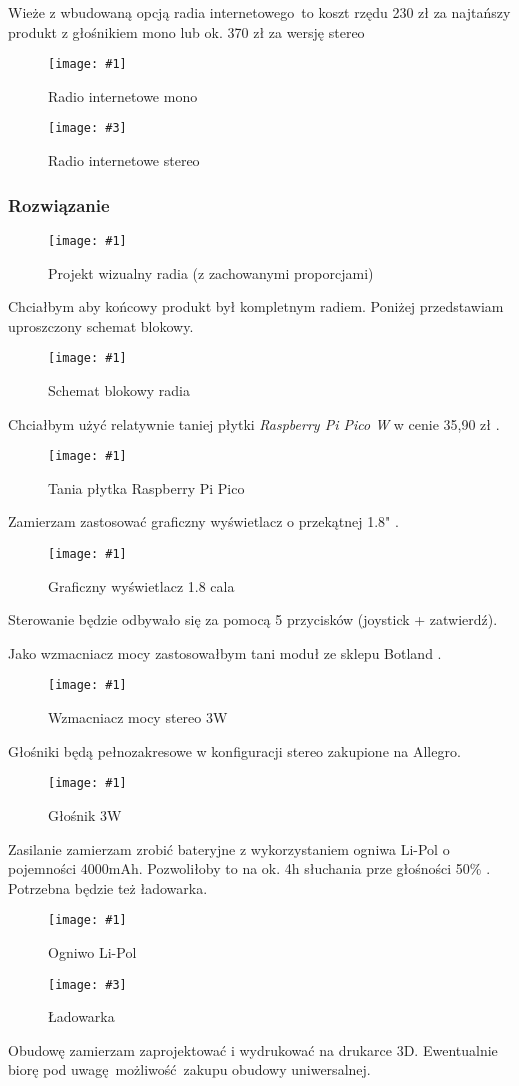\documentclass[12pt]{article}
\newcommand{\imgcustomsize}[3]{
	\begin{figure}[H]
		\centering
		\texttt{[image: \#1]}
		\caption{#2}
	\end{figure}
}
\newcommand{\img}[2]{\imgcustomsize{#1}{#2}{0.7}}
\newcommand{\imgsidebyside}[4]{
	\begin{figure}[H]
		\centering
		\begin{minipage}{.45\textwidth}
			\centering
			\texttt{[image: \#1]}
			\caption{#2}
		\end{minipage}%
		\hfill
		\begin{minipage}{.45\textwidth}
			\centering
			\texttt{[image: \#3]}
			\caption{#4}
		\end{minipage}
	\end{figure}
}
\begin{document}
		Wieże z wbudowaną opcją radia internetowego to koszt rzędu 230 zł za najtańszy produkt z głośnikiem mono \textsuperscript{\cite{xkom_tanie}} lub ok. 370 zł za wersję stereo \textsuperscript{\cite{xkom_drogie}}
		\imgsidebyside{xkom_tanie}{Radio internetowe mono}{xkom_drogie}{Radio internetowe stereo}
		
		\subsubsection{Rozwiązanie}
		\imgcustomsize{radio_proj_trimmed}{Projekt wizualny radia (z zachowanymi proporcjami)}{0.9}
		
		
		Chciałbym aby końcowy produkt był kompletnym radiem. Poniżej przedstawiam uproszczony schemat blokowy.
		\imgcustomsize{PicoRadio_blocks}{Schemat blokowy radia}{1}
		
		\pagebreak
		Chciałbym użyć relatywnie taniej płytki \textit{Raspberry Pi Pico W} w cenie 35,90 zł \textsuperscript{\cite{botland_pi_pico}}.
		\img{botland_pi_pico}{Tania płytka Raspberry Pi Pico}	
		
		Zamierzam zastosować graficzny wyświetlacz o przekątnej 1.8" \textsuperscript{\cite{botland_wysw}}.
		\img{botland_wysw}{Graficzny wyświetlacz 1.8 cala}
		Sterowanie będzie odbywało się za pomocą 5 przycisków (joystick + zatwierdź).
		
		Jako wzmacniacz mocy zastosowałbym tani moduł ze sklepu Botland \textsuperscript{\cite{botland_amp}}.
		\img{botland_amp}{Wzmacniacz mocy stereo 3W}
		
		Głośniki będą pełnozakresowe w konfiguracji stereo zakupione na Allegro. \textsuperscript{\cite{allegro_glosnik}}
		\img{allegro_glosnik}{Głośnik 3W}
		
		Zasilanie zamierzam zrobić bateryjne z wykorzystaniem ogniwa Li-Pol o pojemności 4000mAh. Pozwoliłoby to na ok. 4h słuchania prze głośności 50\% \textsuperscript{\cite{botland_aku}}. Potrzebna będzie też ładowarka. \textsuperscript{\cite{botland_aku_chg}}
		\imgsidebyside{botland_aku}{Ogniwo Li-Pol}{botland_aku_chg}{Ładowarka}
		
		Obudowę zamierzam zaprojektować i wydrukować na drukarce 3D. Ewentualnie biorę pod uwagę możliwość zakupu obudowy uniwersalnej.
		
\end{document}
